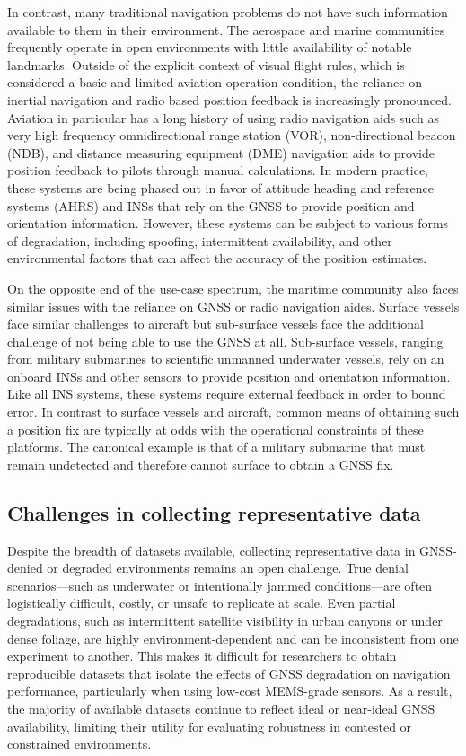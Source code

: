 \documentclass[Afour,sageh,times]{sagej}
\begin{document}
In contrast, many traditional navigation problems do not have such information available to them in their environment. The aerospace and marine communities frequently operate in open environments with little availability of notable landmarks. Outside of the explicit context of visual flight rules, which is considered a basic and limited aviation operation condition, the reliance on inertial navigation and radio based position feedback is increasingly pronounced. Aviation in particular has a long history of using radio navigation aids such as very high frequency omnidirectional range station (VOR), non-directional beacon (NDB), and distance measuring equipment (DME) navigation aids to provide position feedback to pilots through manual calculations. In modern practice, these systems are being phased out in favor of attitude heading and reference systems (AHRS) and INSs that rely on the GNSS to provide position and orientation information. However, these systems can be subject to various forms of degradation, including spoofing, intermittent availability, and other environmental factors that can affect the accuracy of the position estimates.

On the opposite end of the use-case spectrum, the maritime community also faces similar issues with the reliance on GNSS or radio navigation aides. Surface vessels face similar challenges to aircraft but sub-surface vessels face the additional challenge of not being able to use the GNSS at all. Sub-surface vessels, ranging from military submarines to scientific unmanned underwater vessels, rely on an onboard INSs and other sensors to provide position and orientation information. Like all INS systems, these systems require external feedback in order to bound error. In contrast to surface vessels and aircraft, common means of obtaining such a position fix are typically at odds with the operational constraints of these platforms. The canonical example is that of a military submarine that must remain undetected and therefore cannot surface to obtain a GNSS fix.

\subsection{Challenges in collecting representative data}
Despite the breadth of datasets available, collecting representative data in GNSS-denied or degraded environments remains an open challenge. True denial scenarios—such as underwater or intentionally jammed conditions—are often logistically difficult, costly, or unsafe to replicate at scale. Even partial degradations, such as intermittent satellite visibility in urban canyons or under dense foliage, are highly environment-dependent and can be inconsistent from one experiment to another. This makes it difficult for researchers to obtain reproducible datasets that isolate the effects of GNSS degradation on navigation performance, particularly when using low-cost MEMS-grade sensors. As a result, the majority of available datasets continue to reflect ideal or near-ideal GNSS availability, limiting their utility for evaluating robustness in contested or constrained environments.
\end{document}
